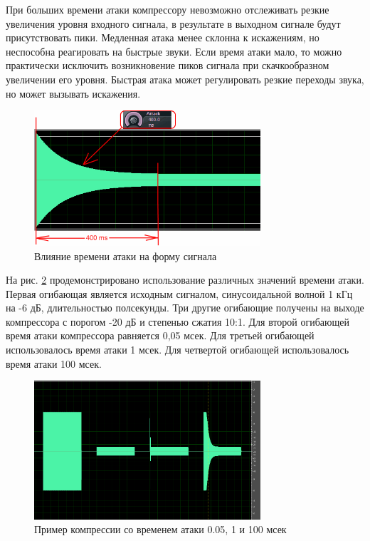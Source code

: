 \documentclass[oneside, final, 14pt]{extreport}
\begin{document}
При больших времени атаки компрессору невозможно отслеживать резкие увеличения уровня входного сигнала, в результате в выходном сигнале будут присутствовать пики. Медленная атака менее склонна к искажениям, но неспособна реагировать на быстрые звуки. Если время атаки мало, то можно практически исключить возникновение пиков сигнала при скачкообразном увеличении его уровня. Быстрая атака может регулировать резкие переходы звука, но может вызывать искажения.

\begin{figure}[h!]
  \centering
  \includegraphics[width=0.75\textwidth]{pic-compress-04}
  \caption{Влияние времени атаки на форму сигнала}
  \label{pic-compress-04}
\end{figure}

На рис. \ref{pic-compress-05} продемонстрировано использование различных значений времени атаки. Первая огибающая является исходным сигналом, синусоидальной волной 1 кГц на -6 дБ, длительностью полсекунды. Три другие огибающие получены на выходе компрессора с порогом -20 дБ и степенью сжатия 10:1. Для второй огибающей время атаки компрессора равняется 0,05 мсек. Для третьей огибающей использовалось время атаки 1 мсек. Для четвертой огибающей использовалось время атаки 100 мсек.

\begin{figure}[h!]
  \centering
  \includegraphics[width=0.75\textwidth]{pic-compress-05}
  \caption{Пример компрессии со временем атаки 0.05, 1 и 100 мсек}
  \label{pic-compress-05}
\end{figure}
\end{document}
